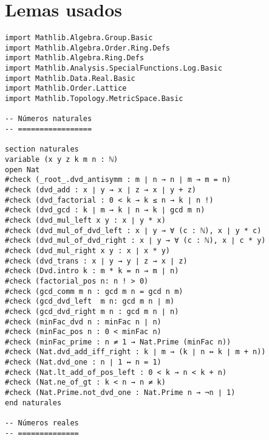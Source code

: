 \chapter*{Lemas usados}
\begin{verbatim}
import Mathlib.Algebra.Group.Basic
import Mathlib.Algebra.Order.Ring.Defs
import Mathlib.Algebra.Ring.Defs
import Mathlib.Analysis.SpecialFunctions.Log.Basic
import Mathlib.Data.Real.Basic
import Mathlib.Order.Lattice
import Mathlib.Topology.MetricSpace.Basic

-- Números naturales
-- =================

section naturales
variable (x y z k m n : ℕ)
open Nat
#check (_root_.dvd_antisymm : m ∣ n → n ∣ m → m = n)
#check (dvd_add : x ∣ y → x ∣ z → x ∣ y + z)
#check (dvd_factorial : 0 < k → k ≤ n → k ∣ n !)
#check (dvd_gcd : k ∣ m → k ∣ n → k ∣ gcd m n)
#check (dvd_mul_left x y : x ∣ y * x)
#check (dvd_mul_of_dvd_left : x ∣ y → ∀ (c : ℕ), x ∣ y * c)
#check (dvd_mul_of_dvd_right : x ∣ y → ∀ (c : ℕ), x ∣ c * y)
#check (dvd_mul_right x y : x ∣ x * y)
#check (dvd_trans : x ∣ y → y ∣ z → x ∣ z)
#check (Dvd.intro k : m * k = n → m ∣ n)
#check (factorial_pos n: n ! > 0)
#check (gcd_comm m n : gcd m n = gcd n m)
#check (gcd_dvd_left  m n: gcd m n ∣ m)
#check (gcd_dvd_right m n : gcd m n ∣ n)
#check (minFac_dvd n : minFac n ∣ n)
#check (minFac_pos n : 0 < minFac n)
#check (minFac_prime : n ≠ 1 → Nat.Prime (minFac n))
#check (Nat.dvd_add_iff_right : k ∣ m → (k ∣ n ↔ k ∣ m + n))
#check (Nat.dvd_one : n ∣ 1 ↔ n = 1)
#check (Nat.lt_add_of_pos_left : 0 < k → n < k + n)
#check (Nat.ne_of_gt : k < n → n ≠ k)
#check (Nat.Prime.not_dvd_one : Nat.Prime n → ¬n ∣ 1)
end naturales

-- Números reales
-- ==============


\end{verbatim}
